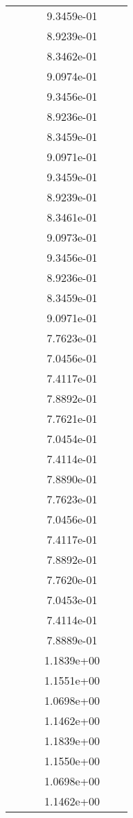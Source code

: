 \begin{xltabular}{\textwidth}{r|rS[table-format=1.3e+2]S[table-format=1.4e+2]S[table-format=1.4e+2]S[table-format=-1.5]}
&  &  & 9.3459e-01 & & \\
&  &  & 8.9239e-01 & & \\
&  &  & 8.3462e-01 & & \\
&  &  & 9.0974e-01 & & \\
&  &  & 9.3456e-01 & & \\
&  &  & 8.9236e-01 & & \\
&  &  & 8.3459e-01 & & \\
&  &  & 9.0971e-01 & & \\
&  &  & 9.3459e-01 & & \\
&  &  & 8.9239e-01 & & \\
&  &  & 8.3461e-01 & & \\
&  &  & 9.0973e-01 & & \\
&  &  & 9.3456e-01 & & \\
&  &  & 8.9236e-01 & & \\
&  &  & 8.3459e-01 & & \\
&  &  & 9.0971e-01 & & \\
&  &  & 7.7623e-01 & & \\
&  &  & 7.0456e-01 & & \\
&  &  & 7.4117e-01 & & \\
&  &  & 7.8892e-01 & & \\
&  &  & 7.7621e-01 & & \\
&  &  & 7.0454e-01 & & \\
&  &  & 7.4114e-01 & & \\
&  &  & 7.8890e-01 & & \\
&  &  & 7.7623e-01 & & \\
&  &  & 7.0456e-01 & & \\
&  &  & 7.4117e-01 & & \\
&  &  & 7.8892e-01 & & \\
&  &  & 7.7620e-01 & & \\
&  &  & 7.0453e-01 & & \\
&  &  & 7.4114e-01 & & \\
&  &  & 7.8889e-01 & & \\
&  &  & 1.1839e+00 & & \\
&  &  & 1.1551e+00 & & \\
&  &  & 1.0698e+00 & & \\
&  &  & 1.1462e+00 & & \\
&  &  & 1.1839e+00 & & \\
&  &  & 1.1550e+00 & & \\
&  &  & 1.0698e+00 & & \\
&  &  & 1.1462e+00 & & \\

\end{xltabular}
